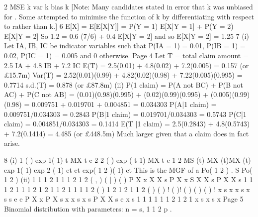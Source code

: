 \documentclass[a4paper,12pt]{article}
\begin{document}
2
MSE k var k bias k
[Note: Many candidates stated in error that k was unbiased for . Some attempted
to minimise the function of k by differentiating with respect to rather than k.]
6 E[X] = E[E[X|Y]] = P(Y = 1) E[X|Y = 1] + P(Y = 2) E[X|Y = 2]
So 1.2 = 0.6 (7/6) + 0.4 E[X|Y = 2] and so E[X|Y = 2] = 1.25
7 (i) Let IA, IB, IC be indicator variables such that
P(IA = 1) = 0.01, P(IB = 1) = 0.02, P(IC = 1) = 0.005 and 0 otherwise.
Page 4
Let T = total claim amount = 2.5 IA + 4.8 IB + 7.2 IC
E(T) = 2.5(0.01) + 4.8(0.02) + 7.2(0.005) = 0.157 (or £15.7m)
Var(T) = 2.52(0.01)(0.99) + 4.82(0.02)(0.98) + 7.22(0.005)(0.995) = 0.7714
s.d.(T) = 0.878 (or £87.8m)
(ii) P(1 claim) = P(A not BC) + P(B not AC) + P(C not AB)
= (0.01)(0.98)(0.995) + (0.02)(0.99)(0.995) + (0.005)(0.99)(0.98)
= 0.009751 + 0.019701 + 0.004851 = 0.034303
P(A|1 claim) = 0.009751/0.034303 = 0.2843
P(B|1 claim) = 0.019701/0.034303 = 0.5743
P(C|1 claim) = 0.004851/0.034303 = 0.1414
E(T |1 claim) = 2.5(0.2843) + 4.8(0.5743) + 7.2(0.1414) = 4.485
(or £448.5m)
Much larger given that a claim does in fact arise.



8 (i)
1 ( ) exp{ 1( 1)} t
MX t e
2 2 ( ) exp{ ( t 1)}
MX t e
1 2
MS (t) MX (t)MX (t)
exp{ 1( 1)} exp{ 2 ( 1)} et et
exp{( 1 2 )( 1)} et
This is the MGF of a Po( 1 2 ) .
S Po( 1 2 )
(ii) 1 1 1 2
1 1 1 2
1 2
( , )
( | )
( )
P X x X X s
P X x S X X s
P X X s
1 1 1 2
1 1
1 2
1 2
1 1 2 1 1 1 1 2
( )
1 2 1 2 1 1 2
( ) ( ) ! ( )!
( ) ( ) ( )
!
x s x
x s x
s s
e e
P X x P X s x x s x s
P X X s e x
s
1 1
1 1
1 1 2 1 2
1
x s x s
x
Page 5
Binomial distribution with parameters: n = s, 1
1 2
p .
\end{document}
